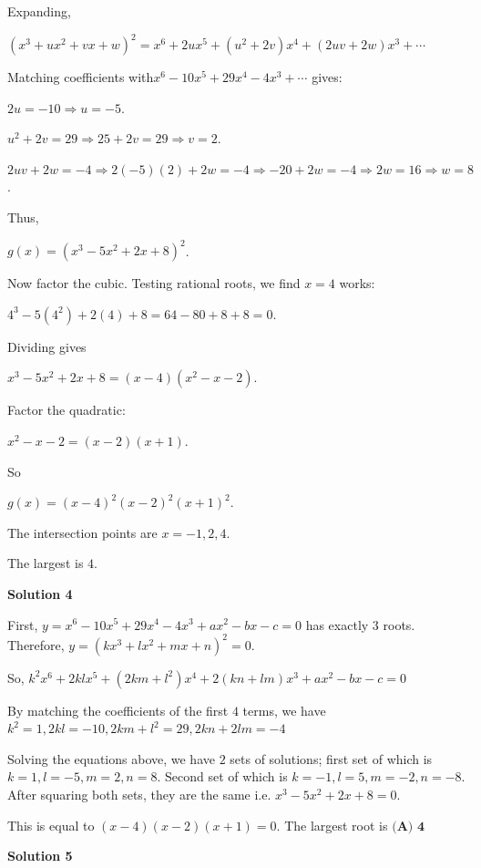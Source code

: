 \begin{enumerate}
 Expanding,

 $(x^3 + ux^2 + vx + w)^2 = x^6 + 2u x^5 + (u^2 + 2v)x^4 + (2uv + 2w)x^3 + \cdots$

 Matching coefficients with$x^6 - 10x^5 + 29x^4 - 4x^3 + \cdots$ gives:

 $2u = -10 \Rightarrow u = -5$.

 $u^2 + 2v = 29 \Rightarrow 25 + 2v = 29 \Rightarrow v = 2$.

 $2uv + 2w = -4 \Rightarrow 2(-5)(2) + 2w = -4 \Rightarrow -20 + 2w = -4 \Rightarrow 2w = 16 \Rightarrow w = 8$.

 Thus,

 $g(x) = (x^3 - 5x^2 + 2x + 8)^2$.

 Now factor the cubic. Testing rational roots, we find $x=4$ works:

 $4^3 - 5(4^2) + 2(4) + 8 = 64 - 80 + 8 + 8 = 0$.

 Dividing gives

 $x^3 - 5x^2 + 2x + 8 = (x-4)(x^2 - x - 2)$.

 Factor the quadratic:

 $x^2 - x - 2 = (x-2)(x+1)$.

 So

 $g(x) = (x-4)^2 (x-2)^2 (x+1)^2$.

 The intersection points are $x = -1, 2, 4$.

 The largest is $\boxed{4}$.

 



\textbf{Solution 4}

First, $y=x^6-10x^5+29x^4-4x^3+ax^2-bx-c = 0$ has exactly $3$ roots. Therefore, $y = (kx^3+lx^2+mx+n)^2 = 0$.

 So, $k^2x^6+2klx^5+(2km+l^2)x^4+2(kn+lm)x^3+ax^2-bx-c = 0$

 By matching the coefficients of the first $4$ terms, we have $k^2 = 1, 2kl = -10, 2km+l^2 = 29, 2kn+2lm = -4$

 Solving the equations above, we have $2$ sets of solutions; first set of which is $k = 1, l = -5, m = 2, n = 8$. Second set of which is $k = -1, l = 5, m = -2, n = -8$. After squaring both sets, they are the same i.e. $x^3-5x^2+2x+8 = 0$.

 This is equal to $(x-4)(x-2)(x+1) = 0$. The largest root is $\boxed {\textbf{(A) 4}}$




\textbf{Solution 5}


\end{enumerate}
